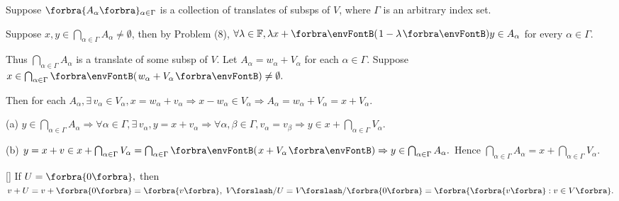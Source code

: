 \documentclass[a4paper, 11pt, UTF8]{article}
\begin{document}
\begin{large}
\par\quad
Suppose $\Bra{A_{\alpha}}{_{\alpha\in\Gamma}}$ is a collection of translates of subsps of $V$, where $\Gamma$ is an arbitrary index set.\vspace{8pt}\par\quad
Suppose $x,y\in\bigcap_{\alpha\in\Gamma}A_{\alpha}\neq\emptyset$, then by Problem (8), $\forall\lambda\in\Fbb,\lambda x+\Par{1-\lambda}y\in A_{\alpha}$ for every $\alpha\in\Gamma$.\par\quad
Thus $\bigcap_{\alpha\in\Gamma}A_\alpha$ is a translate of some subsp of $V$.\PfEnd\vspace{6pt}\quad
\Or Let $A_\alpha=w_\alpha+V_\alpha$ for each $\alpha\in\Gamma$. Suppose $x\in\bigcap_{\alpha\in\Gamma}\Par{w_\alpha+V_\alpha}\neq\emptyset.$\par\quad
Then for each $A_\alpha,\exists\,v_\alpha\in V_\alpha,x=w_\alpha+v_\alpha\Rightarrow x-w_\alpha\in V_\alpha\Rightarrow A_\alpha=w_\alpha+V_\alpha=x+V_\alpha.$\vspace{3pt}\par\quad
(a) $y\in\bigcap_{\alpha\in\Gamma}A_\alpha\Rightarrow\forall\alpha\in\Gamma,\exists\,v_\alpha,y=x+v_\alpha\Rightarrow\forall\alpha,\beta\in\Gamma,v_\alpha=v_\beta\Rightarrow y\in x+\bigcap_{\alpha\in\Gamma}V_\alpha.$\vspace{3pt}\par\quad
(b) $y=x+v\in x+\bigcap_{\alpha\in\Gamma}V_\alpha=\bigcap_{\alpha\in\Gamma}\Par{x+V_\alpha}\Rightarrow y\in\bigcap_{\alpha\in\Gamma}A_\alpha.$ Hence $\bigcap_{\alpha\in\Gamma}A_\alpha=x+\bigcap_{\alpha\in\Gamma}V_\alpha.$\PfEnd
\SepLine

\ProblemBnoor[]{\NoteForSmall{[3.79, 3.83]}}[]{
	{If $U=\zeroSubs,$ then $v+U=v+\zeroSubs=\Bra{v},\;V\mySlash U=V\mySlash\zeroSubs=\Bra{\Bra{v}:v\in V}.$}\TextB{\vspace{-3pt}}
}\SepLine\pagebreak


\end{large}
\end{document}
